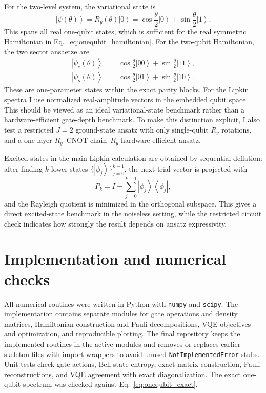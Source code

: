 \documentclass[10pt,a4paper]{article}
\newcommand{\ket}[1]{\left|#1\right\rangle}
\newcommand{\bra}[1]{\left\langle #1\right|}
\begin{document}
For the two-level system, the variational state is
\begin{equation}
\ket{\psi(\theta)}=R_y(\theta)\ket{0}=\cos\frac{\theta}{2}\ket{0}+\sin\frac{\theta}{2}\ket{1}.
\end{equation}
This spans all real one-qubit states, which is sufficient for the real symmetric Hamiltonian in Eq.~\eqref{eq:onequbit_hamiltonian}. For the two-qubit Hamiltonian, the two sector ansaetze are
\begin{align}
\ket{\psi_e(\theta)}&=\cos\frac{\theta}{2}\ket{00}+\sin\frac{\theta}{2}\ket{11},\\
\ket{\psi_o(\theta)}&=\cos\frac{\theta}{2}\ket{01}+\sin\frac{\theta}{2}\ket{10}.
\end{align}
These are one-parameter states within the exact parity blocks. For the Lipkin spectra I use normalized real-amplitude vectors in the embedded qubit space. This should be viewed as an ideal variational-state benchmark rather than a hardware-efficient gate-depth benchmark. To make this distinction explicit, I also test a restricted $J=2$ ground-state ansatz with only single-qubit $R_y$ rotations, and a one-layer $R_y$--CNOT-chain--$R_y$ hardware-efficient ansatz.

Excited states in the main Lipkin calculation are obtained by sequential deflation: after finding $k$ lower states $\{\ket{\phi_j}\}_{j=0}^{k-1}$, the next trial vector is projected with
\begin{equation}
P_k=I-\sum_{j=0}^{k-1}\ket{\phi_j}\bra{\phi_j},
\end{equation}
and the Rayleigh quotient is minimized in the orthogonal subspace. This gives a direct excited-state benchmark in the noiseless setting, while the restricted circuit check indicates how strongly the result depends on ansatz expressivity.

\section{Implementation and numerical checks}

All numerical routines were written in Python with \texttt{numpy} and \texttt{scipy}. The implementation contains separate modules for gate operations and density matrices, Hamiltonian construction and Pauli decompositions, VQE objectives and optimization, and reproducible plotting. The final repository keeps the implemented routines in the active modules and removes or replaces earlier skeleton files with import wrappers to avoid unused \texttt{NotImplementedError} stubs. Unit tests check gate actions, Bell-state entropy, exact matrix construction, Pauli reconstructions, and VQE agreement with exact diagonalization. The exact one-qubit spectrum was checked against Eq.~\eqref{eq:onequbit_exact}.
\end{document}
